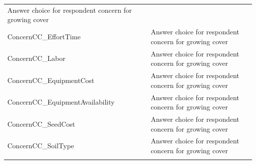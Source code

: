 \documentclass[12pt,]{article}
\begin{document}
\begin{longtable}[]{@{}ll@{}}
\begin{minipage}[t]{0.18\columnwidth}
Answer choice for respondent concern for growing cover\strut
\end{minipage}\tabularnewline
\begin{minipage}[t]{0.59\columnwidth}\raggedright\strut
ConcernCC\_EffortTime\strut
\end{minipage} & \begin{minipage}[t]{0.18\columnwidth}\raggedright\strut
Answer choice for respondent concern for growing cover\strut
\end{minipage}\tabularnewline
\begin{minipage}[t]{0.59\columnwidth}\raggedright\strut
ConcernCC\_Labor\strut
\end{minipage} & \begin{minipage}[t]{0.18\columnwidth}\raggedright\strut
Answer choice for respondent concern for growing cover\strut
\end{minipage}\tabularnewline
\begin{minipage}[t]{0.59\columnwidth}\raggedright\strut
ConcernCC\_EquipmentCost\strut
\end{minipage} & \begin{minipage}[t]{0.18\columnwidth}\raggedright\strut
Answer choice for respondent concern for growing cover\strut
\end{minipage}\tabularnewline
\begin{minipage}[t]{0.59\columnwidth}\raggedright\strut
ConcernCC\_EquipmentAvailability\strut
\end{minipage} & \begin{minipage}[t]{0.18\columnwidth}\raggedright\strut
Answer choice for respondent concern for growing cover\strut
\end{minipage}\tabularnewline
\begin{minipage}[t]{0.59\columnwidth}\raggedright\strut
ConcernCC\_SeedCost\strut
\end{minipage} & \begin{minipage}[t]{0.18\columnwidth}\raggedright\strut
Answer choice for respondent concern for growing cover\strut
\end{minipage}\tabularnewline
\begin{minipage}[t]{0.59\columnwidth}\raggedright\strut
ConcernCC\_SoilType\strut
\end{minipage} & \begin{minipage}[t]{0.18\columnwidth}\raggedright\strut
Answer choice for respondent concern for growing cover\strut
\end{minipage}\tabularnewline
\begin{minipage}[t]{0.59\columnwidth}\raggedright\strut

\end{minipage}
\end{longtable}
\end{document}
